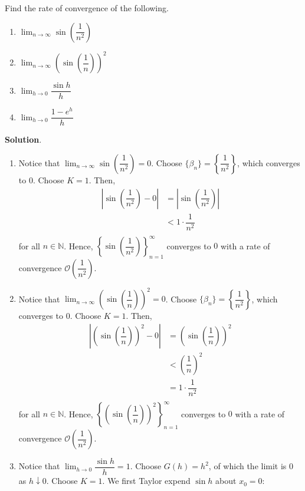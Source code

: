 \documentclass[11pt]{article}
\theoremstyle{break}
\numberwithin{equation}{theorem}
\begin{document}
\newpage
\begin{problem}\label{problem 10}
    Find the rate of convergence of the following.
    \begin{enumerate}
        \item $\displaystyle\lim_{n\to\infty}\sin\left(\dfrac{1}{n^2}\right)$
        \item $\displaystyle\lim_{n\to\infty}\left(\sin\left(\dfrac{1}{n}\right)\right)^2$
        \item $\displaystyle\lim_{h\to 0}\dfrac{\sin h}{h}$
        \item $\displaystyle\lim_{h\to 0}\dfrac{1-e^h}{h}$
    \end{enumerate}
\end{problem}
\textbf{Solution}.
\begin{enumerate}
    \item Notice that $\displaystyle\lim_{n\to\infty}\sin\left(\dfrac{1}{n^2}\right)=0$. Choose $\{\beta_n\}=\left\{\dfrac{1}{n^2}\right\}$, which converges to $0$. Choose $K=1$. Then, \vspace{-0.6em}
    \begin{align*}
        \left\lvert\sin\left(\dfrac{1}{n^2}\right)-0\right\rvert&=\left\lvert\sin\left(\dfrac{1}{n^2}\right)\right\rvert\\
        &<1\cdot\dfrac{1}{n^2}\\[-3.4em]
    \end{align*}
    for all $n\in\mathbb{N}$. Hence, $\left\{\sin\left(\dfrac{1}{n^2}\right)\right\}_{n=1}^\infty$ converges to $0$ with a rate of convergence $\mathcal{O}\left(\dfrac{1}{n^2}\right)$.
    \item Notice that $\displaystyle\lim_{n\to\infty}\left(\sin\left(\dfrac{1}{n}\right)\right)^2=0$. Choose $\{\beta_n\}=\left\{\dfrac{1}{n^2}\right\}$, which converges to $0$. Choose $K=1$. Then, \vspace{-0.6em}
    \begin{align*}
        \left\lvert\left(\sin\left(\dfrac{1}{n}\right)\right)^2-0\right\rvert&=\left(\sin\left(\dfrac{1}{n}\right)\right)^2\\
        &<\left(\dfrac{1}{n}\right)^2\\
        &=1\cdot\dfrac{1}{n^2}\\[-3.4em]
    \end{align*}
    for all $n\in\mathbb{N}$. Hence, $\left\{\left(\sin\left(\dfrac{1}{n}\right)\right)^2\right\}_{n=1}^\infty$ converges to $0$ with a rate of convergence $\mathcal{O}\left(\dfrac{1}{n^2}\right)$.
    \item Notice that $\displaystyle\lim_{h\to 0}\dfrac{\sin h}{h}=1$. Choose $G(h)=h^2$, of which the limit is $0$ as $h\downarrow 0$. Choose $K=1$. We first Taylor expend $\sin h$ about $x_0=0$: \vspace{-0.6em}

\end{enumerate}
\end{document}
